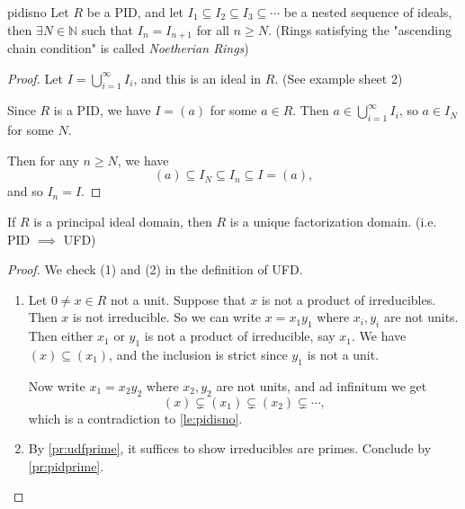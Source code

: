 \begin{lemma}{}{pidisno}
    Let \(R\) be a PID, and let \(I_1 \subseteq I_2 \subseteq I_3 \subseteq \cdots\) be a nested sequence of ideals, then \(\exists N \in \mathbb{N}\) such that \(I_n = I_{n+1}\) for all \(n \geq N\). (Rings satisfying the "ascending chain condition" is called \textit{Noetherian Rings})
\end{lemma}
\begin{proof}
    Let \(I = \bigcup_{i=1}^\infty I_i\), and this is an ideal in \(R\). (See example sheet 2)

    Since \(R\) is a PID, we have \(I = (a)\) for some \(a \in R\). Then \(a \in \bigcup_{i=1}^\infty I_i\), so \(a \in I_{N}\) for some \(N\).

    Then for any \(n \geq N\), we have
    \[
        (a) \subseteq I_N \subseteq I_n \subseteq I = (a),
    \]
    and so \(I_n = I\).
\end{proof}
\begin{theorem}{}{}
    If \(R\) is a principal ideal domain, then \(R\) is a unique factorization domain. (i.e. PID \(\implies\) UFD)
\end{theorem}
\begin{proof}
    We check (1) and (2) in the definition of UFD.
    \begin{enumerate}
        \item Let \(0 \neq x \in R\) not a unit. Suppose that \(x\) is not a product of irreducibles. Then \(x\) is not irreducible. So we can write \(x = x_{1}y_1\) where \(x_i, y_i\) are not units. Then either \(x_1\) or \(y_1\) is not a product of irreducible, say \(x_1\). We have \((x) \subseteq (x_1)\), and the inclusion is strict since \(y_1\) is not a unit.

        Now write \(x_1 = x_2 y_2\) where \(x_2, y_2\) are not units, and ad infinitum we get
        \[
            (x)\subsetneq (x_1) \subsetneq (x_2) \subsetneq \cdots,
        \]
        which is a contradiction to \cref{le:pidisno}.
        \item By \cref{pr:udfprime}, it suffices to show irreducibles are primes. Conclude by \cref{pr:pidprime}.
    \end{enumerate}
\end{proof}
